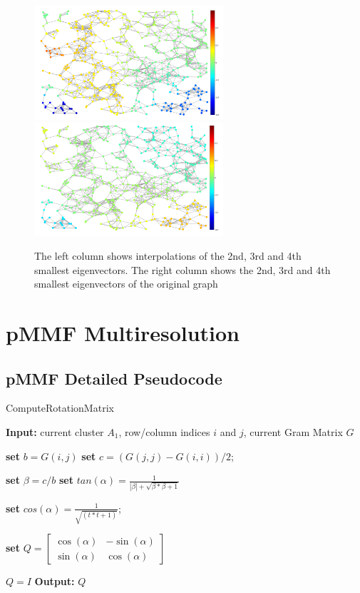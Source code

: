 \documentclass[a4paper]{article}
\begin{document}
\begin{figure}[H]
\includegraphics[width = 7cm]{interpolation/interpolate_4th_eigen}
\includegraphics[width = 7cm]{interpolation/original_4th_eigen}

\caption{The left column shows interpolations of the 2nd, 3rd and 4th smallest eigenvectors. The right column shows the 2nd, 3rd and 4th smallest eigenvectors of the original graph}


\end{figure}

\newpage
\section{pMMF Multiresolution}
\subsection{pMMF Detailed Pseudocode}

\begin{algorithm}[H]
\caption{ComputeRotationMatrix}\label{givens}
\begin{algorithmic}[1]
\State \textbf{Input:} current cluster $A_1$, row/column indices $i$ and $j$, current Gram Matrix $G$

\State \textbf{set} $b = G(i, j)$
\State \textbf{set} $c = (G(j, j) - G(i, i))/2$;

\State \textbf{set} $\beta = c / b$
\State \textbf{set} $tan(\alpha) = \frac{1}{|\beta| + \sqrt{\beta * \beta + 1}}$

\State \textbf{set}  $cos(\alpha) = \frac{1}{\sqrt{(t * t + 1)}}$;

\State \textbf{set}   $Q = \begin{bmatrix}
\cos(\alpha) & -\sin(\alpha) \\
\sin(\alpha)  & \cos(\alpha)
\end{bmatrix}$
\Else

$Q = I$
\EndIf
\State \textbf{Output:} $Q$
\end{algorithmic}
\end{algorithm}
\end{document}
